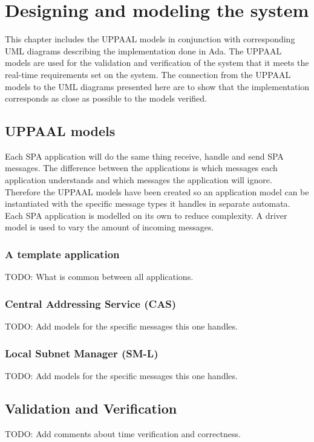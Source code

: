 \chapter{Designing and modeling the system}\label{ch:uppaal_models}
This chapter includes the UPPAAL models in conjunction with corresponding UML
diagrams describing the implementation done in Ada. The UPPAAL models are used
for the validation and verification of the system that it meets the real-time
requirements set on the system. The connection from the UPPAAL models to the
UML diagrams presented here are to show that the implementation corresponds as
close as possible to the models verified.

\section{UPPAAL models}
Each SPA application will do the same thing receive, handle and send SPA
messages. The difference between the applications is which messages each
application understands and which messages the application will ignore.
Therefore the UPPAAL models have been created so an application model can be
instantiated with the specific message types it handles in separate automata.
Each SPA application is modelled on its own to reduce complexity. A driver
model is used to vary the amount of incoming messages.

\subsection{A template application}
TODO: What is common between all applications.

\subsection{Central Addressing Service (CAS)}
TODO: Add models for the specific messages this one handles.

\subsection{Local Subnet Manager (SM-L)}
TODO: Add models for the specific messages this one handles.

\section{Validation and Verification}
TODO: Add comments about time verification and correctness.
